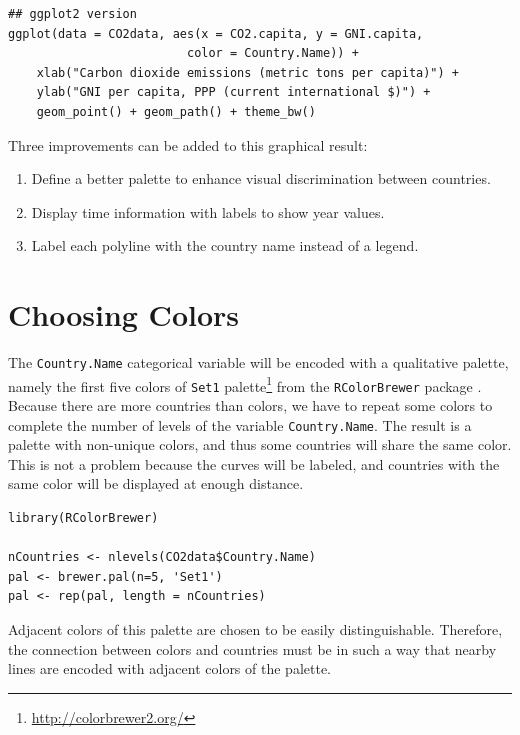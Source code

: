 \lstset{language=r,label= ,caption= ,captionpos=b,numbers=none}
\begin{lstlisting}
## ggplot2 version
ggplot(data = CO2data, aes(x = CO2.capita, y = GNI.capita,
                         color = Country.Name)) +
    xlab("Carbon dioxide emissions (metric tons per capita)") +
    ylab("GNI per capita, PPP (current international $)") +
    geom_point() + geom_path() + theme_bw()
\end{lstlisting}

Three improvements can be added to this graphical result: 
\begin{enumerate}
\item Define a better palette to enhance visual discrimination between
countries.
\item Display time information with labels to show year values.
\item Label each polyline with the country name instead of a legend.
\end{enumerate}

\section{Choosing Colors}
\label{sec:orgc8ebc5d}
The \texttt{Country.Name} categorical variable will be encoded with a
qualitative palette, namely the first five colors of \texttt{Set1}
palette\footnote{\url{http://colorbrewer2.org/}} from the \texttt{RColorBrewer} package
\cite{Neuwirth2011}. Because there are more countries than colors, we
have to repeat some colors to complete the number of levels of the
variable \texttt{Country.Name}. The result is a palette with non-unique
colors, and thus some countries will share the same color. This is not
a problem because the curves will be labeled, and countries with the
same color will be displayed at enough distance.


\lstset{language=r,label= ,caption= ,captionpos=b,numbers=none}
\begin{lstlisting}
library(RColorBrewer)

nCountries <- nlevels(CO2data$Country.Name)
pal <- brewer.pal(n=5, 'Set1')
pal <- rep(pal, length = nCountries)
\end{lstlisting}

Adjacent colors of this palette are chosen to be easily
distinguishable. Therefore, the connection between colors and
countries must be in such a way that nearby lines are encoded
with adjacent colors of the palette.

